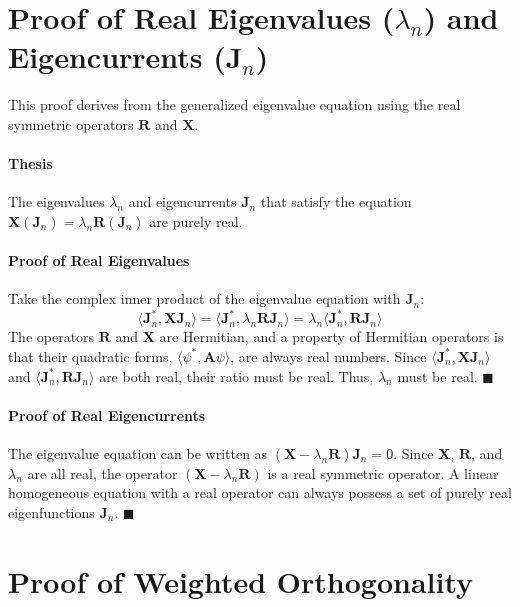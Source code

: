 \documentclass{article}
\begin{document}
\section{Proof of Real Eigenvalues ($\lambda_n$) and Eigencurrents ($\mathbf{J}_n$)}
This proof derives from the generalized eigenvalue equation using the real symmetric operators $\mathbf{R}$ and $\mathbf{X}$. 

\paragraph{Thesis} The eigenvalues $\lambda_n$ and eigencurrents $\mathbf{J}_n$ that satisfy the equation $\mathbf{X}(\mathbf{J}_n) = \lambda_n \mathbf{R}(\mathbf{J}_n)$ are purely real. 

\paragraph{Proof of Real Eigenvalues}
Take the complex inner product of the eigenvalue equation with $\mathbf{J}_n$:
\begin{equation}
    \langle \mathbf{J}_n^*, \mathbf{X}\mathbf{J}_n \rangle = \langle \mathbf{J}_n^*, \lambda_n \mathbf{R}\mathbf{J}_n \rangle = \lambda_n \langle \mathbf{J}_n^*, \mathbf{R}\mathbf{J}_n \rangle
\end{equation}
The operators $\mathbf{R}$ and $\mathbf{X}$ are Hermitian, and a property of Hermitian operators is that their quadratic forms, $\langle \psi^*, \mathbf{A}\psi \rangle$, are always real numbers. Since $\langle \mathbf{J}_n^*, \mathbf{X}\mathbf{J}_n \rangle$ and $\langle \mathbf{J}_n^*, \mathbf{R}\mathbf{J}_n \rangle$ are both real, their ratio must be real. Thus, $\lambda_n$ must be real. $\blacksquare$

\paragraph{Proof of Real Eigencurrents}
The eigenvalue equation can be written as $(\mathbf{X} - \lambda_n \mathbf{R})\mathbf{J}_n = 0$. Since $\mathbf{X}$, $\mathbf{R}$, and $\lambda_n$ are all real, the operator $(\mathbf{X} - \lambda_n \mathbf{R})$ is a real symmetric operator. A linear homogeneous equation with a real operator can always possess a set of purely real eigenfunctions $\mathbf{J}_n$.  $\blacksquare$

\section{Proof of Weighted Orthogonality}
\end{document}
